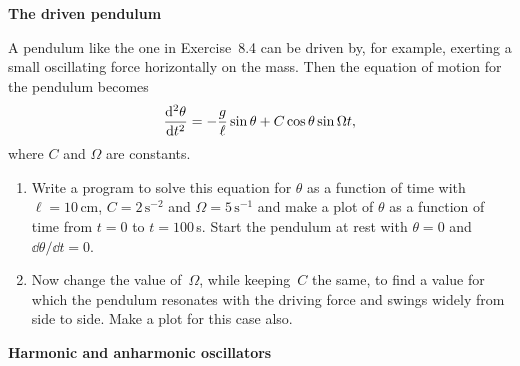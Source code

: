 \documentclass[12pt]{article}
\begin{document}
\begin{exercises}

\exercise \textbf{The driven pendulum}

\exskip A pendulum like the one in Exercise~8.4 can be driven by, for
example, exerting a small oscillating force horizontally on the mass.  Then
the equation of motion for the pendulum becomes
\begin{displaymath}
{\mathrm{d}^2\theta\over\mathrm{d}t^2} = - {g\over\ell}\sin\theta
  + C \cos\theta \sin\Omega t,
\end{displaymath}
where $C$ and $\Omega$ are constants.
\begin{enumerate}\setlength{\itemsep}{0pt}
\item Write a program to solve this equation for $\theta$ as a function of
  time with $\ell=10\,$cm, $C=2\,\mathrm{s}^{-2}$ and
  $\Omega=5\,\mathrm{s}^{-1}$ and make a plot of $\theta$ as a function of
  time from $t=0$ to $t=100\,$s.  Start the pendulum at rest with
  $\theta=0$ and $\dd\theta/\dd t=0$.
\item Now change the value of~$\Omega$, while keeping~$C$ the same, to find
  a value for which the pendulum resonates with the driving force and
  swings widely from side to side.  Make a plot for this case also.
\end{enumerate}



\exercise \textbf{Harmonic and anharmonic oscillators}


\end{exercises}
\end{document}
